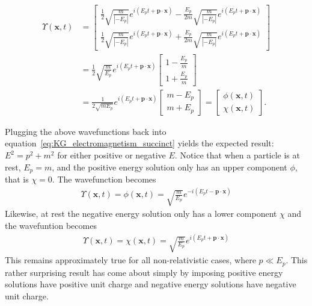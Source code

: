 \documentclass[titlepage,letterpaper,onecolumn,11pt,final]{report}
\numberwithin{equation}{section}
\numberwithin{figure}{section}
\begin{document}
\begin{equation}
\begin{split}
	\label{eq:negative_E_upsilon}
	\Upsilon (\mathbf{x}, t) &= 
	\begin{bmatrix}
		\frac{1}{2} \sqrt{\frac{m}{|-E_{p}|}} e^{i(E_{p} t + \mathbf{p} \cdot \mathbf{x})} - \frac{E_{p}}{2 m} \sqrt{\frac{m}{|-E_{p}|}} e^{i(E_{p} t + \mathbf{p} \cdot \mathbf{x})} \\[6pt]
		\frac{1}{2} \sqrt{\frac{m}{|-E_{p}|}} e^{i(E_{p} t + \mathbf{p} \cdot \mathbf{x})} + \frac{E_{p}}{2 m} \sqrt{\frac{m}{|-E_{p}|}} e^{i(E_{p} t + \mathbf{p} \cdot \mathbf{x})}
	\end{bmatrix} \\
	&= \frac{1}{2} \sqrt{\frac{m}{E_{p}}} e^{i(E_{p} t + \mathbf{p} \cdot \mathbf{x})}
	\begin{bmatrix}
		1 - \frac{E_{p}}{m} \\[6pt]
		1 + \frac{E_{p}}{m}
	\end{bmatrix} \\
	&= \frac{1}{2 \sqrt{m E_{p}}} e^{i(E_{p} t + \mathbf{p} \cdot \mathbf{x})}
	\begin{bmatrix}
		m - E_{p} \\[6pt]
		m + E_{p}
	\end{bmatrix} =
	\begin{bmatrix}
		\phi (\mathbf{x}, t)\\[6pt]
		\chi (\mathbf{x}, t)
	\end{bmatrix}.
\end{split}
\end{equation}

Plugging the above wavefunctions back into equation~\ref{eq:KG_electromagnetism_succinct} yields the expected result: $E^{2} = p^{2} + m^{2}$ for either positive or negative $E$. Notice that when a particle is at rest, $E_{p} = m$, and the positive energy solution only has an upper component $\phi$, that is $\chi = 0$. The wavefunction becomes
\begin{gather}
	\label{eq:phi_limit}
	\Upsilon (\mathbf{x}, t) = \phi (\mathbf{x}, t) = \sqrt{\frac{m}{E_{p}}} e^{-i(E_{p} t - \mathbf{p} \cdot \mathbf{x})}
\end{gather}
%
Likewise, at rest the negative energy solution only has a lower component $\chi$ and the wavefuntion becomes
\begin{gather}
	\label{eq:chi_limit}
	\Upsilon (\mathbf{x}, t) = \chi (\mathbf{x}, t) = \sqrt{\frac{m}{E_{p}}} e^{i(E_{p} t + \mathbf{p} \cdot \mathbf{x})}
\end{gather}
This remains approximately true for all non-relativistic cases, where $p \ll E_{p}$. This rather surprising result has come about simply by imposing positive energy solutions have positive unit charge and negative energy solutions have negative unit charge.
\end{document}
